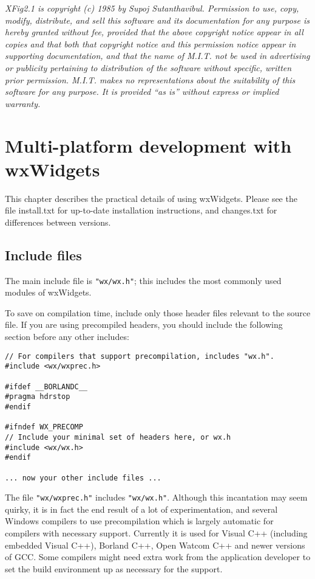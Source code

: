 {\it XFig2.1 is copyright (c) 1985 by Supoj Sutanthavibul. Permission to
use, copy, modify, distribute, and sell this software and its
documentation for any purpose is hereby granted without fee, provided
that the above copyright notice appear in all copies and that both that
copyright notice and this permission notice appear in supporting
documentation, and that the name of M.I.T. not be used in advertising or
publicity pertaining to distribution of the software without specific,
written prior permission.  M.I.T. makes no representations about the
suitability of this software for any purpose.  It is provided ``as is''
without express or implied warranty.}

\chapter{Multi-platform development with wxWidgets}\label{multiplat}
%
\setfooter{\thepage}{}{}{}{}{\thepage}%

This chapter describes the practical details of using wxWidgets. Please
see the file install.txt for up-to-date installation instructions, and
changes.txt for differences between versions.

\section{Include files}\label{includefiles}

The main include file is {\tt "wx/wx.h"}; this includes the most commonly
used modules of wxWidgets.

To save on compilation time, include only those header files relevant to the
source file. If you are using precompiled headers, you should include
the following section before any other includes:

\begin{verbatim}
// For compilers that support precompilation, includes "wx.h".
#include <wx/wxprec.h>

#ifdef __BORLANDC__
#pragma hdrstop
#endif

#ifndef WX_PRECOMP
// Include your minimal set of headers here, or wx.h
#include <wx/wx.h>
#endif

... now your other include files ...
\end{verbatim}

The file {\tt "wx/wxprec.h"} includes {\tt "wx/wx.h"}. Although this incantation
may seem quirky, it is in fact the end result of a lot of experimentation,
and several Windows compilers to use precompilation which is largely automatic for
compilers with necessary support. Currently it is used for Visual C++ (including 
embedded Visual C++), Borland C++, Open Watcom C++ and newer versions of GCC.
Some compilers might need extra work from the application developer to set the
build environment up as necessary for the support.

